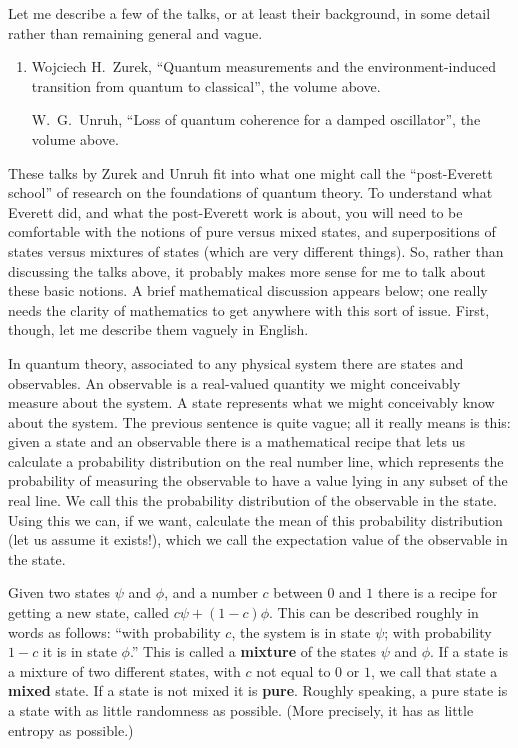 \documentclass[12pt]{article}
\begin{document}
Let me describe a few of the talks, or at least their background, in
some detail rather than remaining general and vague.

\begin{enumerate}
\def\labelenumi{\arabic{enumi})}
\setcounter{enumi}{1}
\item
  Wojciech H.\ Zurek, ``Quantum measurements and the environment-induced transition from quantum to classical'', the volume above.

 W.\ G.\ Unruh, ``Loss of quantum coherence for a damped oscillator'', the volume above.
\end{enumerate}

These talks by Zurek and Unruh fit into what one might call the
``post-Everett school'' of research on the foundations of quantum
theory. To understand what Everett did, and what the post-Everett work
is about, you will need to be comfortable with the notions of pure
versus mixed states, and superpositions of states versus mixtures of
states (which are very different things). So, rather than discussing the
talks above, it probably makes more sense for me to talk about these
basic notions. A brief mathematical discussion appears below; one really
needs the clarity of mathematics to get anywhere with this sort of
issue. First, though, let me describe them vaguely in English.

In quantum theory, associated to any physical system there are states
and observables. An observable is a real-valued quantity we might
conceivably measure about the system. A state represents what we might
conceivably know about the system. The previous sentence is quite vague;
all it really means is this: given a state and an observable there is a
mathematical recipe that lets us calculate a probability distribution on
the real number line, which represents the probability of measuring the
observable to have a value lying in any subset of the real line. We call
this the probability distribution of the observable in the state. Using
this we can, if we want, calculate the mean of this probability
distribution (let us assume it exists!), which we call the expectation
value of the observable in the state.

Given two states \(\psi\) and \(\phi\), and a number \(c\) between \(0\)
and \(1\) there is a recipe for getting a new state, called
\(c \psi + (1-c)\phi\). This can be described roughly in words as
follows: ``with probability \(c\), the system is in state \(\psi\); with
probability \(1-c\) it is in state \(\phi\).'' This is called a
\textbf{mixture} of the states \(\psi\) and \(\phi\). If a state is a
mixture of two different states, with \(c\) not equal to \(0\) or \(1\),
we call that state a \textbf{mixed} state. If a state is not mixed it is
\textbf{pure}. Roughly speaking, a pure state is a state with as little
randomness as possible. (More precisely, it has as little entropy as
possible.)
\end{document}
